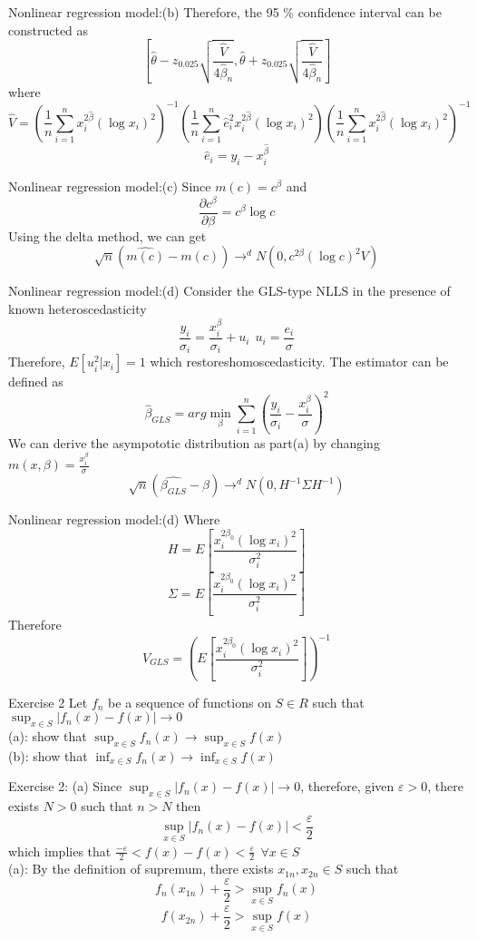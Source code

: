 \documentclass{beamer}
\begin{document}
\begin{frame}{Nonlinear regression model:(b)} 
	Therefore, the 95 \% confidence interval can be constructed as
	\[ [\hat{\theta} - z_{0.025} \sqrt{\frac{\hat{V}}{4 \hat{\beta}_n}}, \hat{\theta} + z_{0.025} \sqrt{\frac{\hat{V}}{4 \hat{\beta}_n}}]\]
	where
	\[\hat{V} = (\frac{1}{n} \sum^n_{i=1} x^{2\hat{\beta}}_i(\log x_i)^2)^{-1} (\frac{1}{n} \sum^n_{i=1} \hat{e}^2_i x^{2\hat{\beta}}_i(\log x_i)^2)(\frac{1}{n} \sum^n_{i=1} x^{2\hat{\beta}}_i(\log x_i)^2)^{-1} \]
	\[\hat{e}_i = y_i - x^{\hat{\beta}}_i\]
\end{frame}
\begin{frame}{Nonlinear regression model:(c)}
Since $m(c) = c^{\beta}$ and 
\[\frac{\partial c^{\beta}}{\partial \beta} = c^{\beta} \log c\]
Using the delta method, we can get 
\[\sqrt{n}(\hat{m(c)} - m(c)) \rightarrow^d N(0,c^{2\beta} (\log c)^2 V) \]
\end{frame}
\begin{frame}{Nonlinear regression model:(d)}
	Consider the GLS-type NLLS in the presence of known heteroscedasticity
	\[\frac{y_i}{\sigma_i} = \frac{x^{\beta}_i}{\sigma_i} + u_i \ \ u_i = \frac{e_i}{\sigma}\]
	Therefore, $E[u^2_i|x_i] = 1$ which restoreshomoscedasticity. The estimator can be defined as 
	\[\hat{\beta}_{GLS} = arg\min_{\beta} \sum^n_{i=1} (\frac{y_i}{\sigma_i} - \frac{x^{\beta}_i}{\sigma})^2\]
	We can derive the asympototic distribution as part(a) by changing $m(x,\beta) = \frac{x^{\beta}_i}{\sigma}$
	\[\sqrt{n}(\hat{\beta_{GLS}} - \beta) \rightarrow^d N(0,H^{-1}\Sigma H^{-1})\]
\end{frame}
\begin{frame}{Nonlinear regression model:(d)}
	Where
	\[H = E[\frac{x^{2 \beta_0}_i (\log x_i)^2}{\sigma^2_i}]\]
	\[\Sigma = E[\frac{x^{2 \beta_0}_i (\log x_i)^2}{\sigma^2_i}]\]
	Therefore
	\[V_{GLS} = (E[\frac{x^{2 \beta_0}_i (\log x_i)^2}{\sigma^2_i}])^{-1}\]
\end{frame}
\begin{frame}{Exercise 2}
	Let $f_n$ be a sequence of functions on $S \in R$ such that $\sup_{x \in S} |f_n(x) - f(x)| \rightarrow 0$ \\
	(a): show that $\sup_{x \in S} f_n(x) \rightarrow \sup_{x \in S} f(x)$ \\
	(b): show that $\inf_{x \in S} f_n(x) \rightarrow \inf_{x \in S} f(x)$
\end{frame}
\begin{frame}{Exercise 2: (a)}
	Since $\sup_{x \in S} |f_n(x) - f(x)| \rightarrow 0$, therefore, given $\varepsilon >0$, there exists $N>0$ such that $n > N$ then
	\[\sup_{x \in S} |f_n(x) - f(x)| < \frac{\varepsilon}{2}\]
	which implies that $\frac{-\varepsilon}{2}< f(x) - f(x) < \frac{\varepsilon}{2} \ \ \forall x \in S$\\
	(a): By the definition of supremum, there exists $x_{1n},x_{2n} \in S$ such that
	\[f_n(x_{1n}) + \frac{\varepsilon}{2} > \sup_{x \in S} f_n(x)\]
	\[f(x_{2n}) + \frac{\varepsilon}{2} > \sup_{x \in S} f(x)\]
\end{frame}
\end{document}
